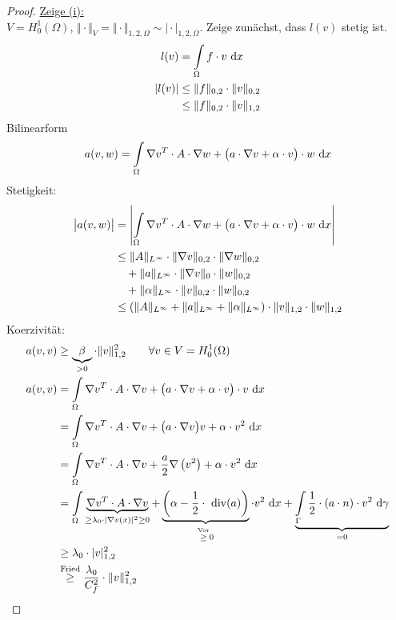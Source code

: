 \begin{proof}
\underline{Zeige (i):}\\
$V=H_0^1(\Omega)$, $\Vert\cdot\Vert_V=\Vert\cdot\Vert_{1,2,\Omega}\sim\vert\cdot\vert_{1,2,\Omega}$. 
Zeige zunächst, dass $l(v)$ stetig ist. %
\begin{align*}
l(v)&=\int\limits_\Omega f\cdot v\text{ d} x\\
|l(v)|&\leq\Vert f\Vert_{0,2}\cdot\Vert v\Vert_{0,2}\\
			&\leq\Vert f\Vert_{0,2}\cdot\Vert v\Vert_{1,2}
\end{align*}
Bilinearform
\begin{align*}
a(v,w)=\int\limits_\Omega\nabla v^T\cdot A\cdot\nabla w+\big(a\cdot\nabla v+\alpha\cdot v\big)\cdot w\text{ d} x
\end{align*}
Stetigkeit:
\begin{align*}
\big|a(v,w)\big|&=\left|\int\limits_\Omega\nabla v^T\cdot A\cdot\nabla w+\big(a\cdot\nabla v+\alpha\cdot v\big)\cdot w\text{ d} x\right|\\
&\leq
\Vert A\Vert_{L^\infty}\cdot\Vert\nabla v\Vert_{0,2}\cdot\Vert\nabla w\Vert_{0,2}\\
&\quad+\Vert a\Vert_{L^\infty} \cdot\Vert\nabla v\Vert_{0}\cdot\Vert w\Vert_{0,2}\\
&\quad+\Vert\alpha\Vert_{L^\infty}\cdot\Vert v\Vert_{0,2}\cdot\Vert w\Vert_{0,2}\\
&\leq
\left(\Vert A\Vert_{L^\infty}+\Vert a\Vert_{L^\infty}+\Vert\alpha\Vert_{L^\infty}\right)\cdot\Vert v\Vert_{1,2}\cdot\Vert w\Vert_{1,2}
\end{align*}
Koerzivität: 
\begin{align*}
a(v,v)&\geq\underbrace{\beta}_{>0}\cdot\Vert v\Vert^2_{1,2}\qquad\forall v\in V=H_0^1(\Omega)\\
a(v,v)&=
\int\limits_\Omega\nabla v^T\cdot A\cdot\nabla v+\big(a\cdot\nabla v+\alpha\cdot v\big)\cdot v\text{ d} x\\
&=\int\limits_\Omega\nabla v^T\cdot A\cdot\nabla v+\big(a\cdot\nabla v\big) v+\alpha\cdot v^2\text{ d} x\\
&=\int\limits_\Omega\nabla v^T\cdot A\cdot\nabla v+\frac{a}{2}\nabla \left(v^2\right)+\alpha\cdot v^2\text{ d} x\\
&=\int\limits_\Omega\underbrace{\nabla v^T\cdot A\cdot\nabla v}_{\geq\lambda_0\cdot|\nabla v(x)|^2\geq0}+\underbrace{\left(\alpha-\frac{1}{2}\cdot\text{ div}(a)\right)}_{\stackrel{\text{Vor}}{\geq}0}\cdot v^2\text{ d} x+\underbrace{\int\limits_{\Gamma}\frac{1}{2}\cdot(a\cdot n)\cdot v^2\text{ d}\gamma}_{=0}\\
&\geq
\lambda_0\cdot |v|^2_{1,2}\\
&\stackrel{\text{Fried}}{\geq}
\frac{\lambda_0}{C_f^2}\cdot\Vert v\Vert^2_{1,2}
\end{align*}


\end{proof}
